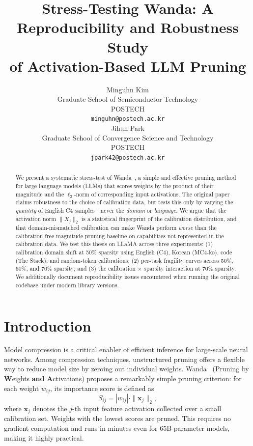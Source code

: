 \documentclass{article}
\title{Stress-Testing Wanda: A Reproducibility and Robustness Study\\
of Activation-Based LLM Pruning}
\author{%
  Minguhn Kim \\
  Graduate School of Semiconductor Technology \\
  POSTECH \\
  \texttt{minguhn@postech.ac.kr} \\
  \And
  Jihun Park \\
  Graduate School of Convergence Science and Technology \\
  POSTECH \\
  \texttt{jpark42@postech.ac.kr}
}
\begin{document}
\maketitle

\begin{abstract}
We present a systematic stress-test of Wanda~\cite{wanda}, a simple and
effective pruning method for large language models (LLMs) that scores weights
by the product of their magnitude and the $\ell_2$-norm of corresponding
input activations. The original paper claims robustness to the choice of
calibration data, but tests this only by varying the \emph{quantity} of
English C4 samples---never the \emph{domain} or \emph{language}. We argue
that the activation norm $\|X_j\|_2$ is a statistical fingerprint of the
calibration distribution, and that domain-mismatched calibration can make
Wanda perform \emph{worse} than the calibration-free magnitude pruning
baseline on capabilities not represented in the calibration data.
We test this thesis on LLaMA across three experiments:
(1) calibration domain shift at 50\% sparsity using English (C4),
Korean (MC4-ko), code (The Stack), and random-token calibrations;
(2) per-task fragility curves across 50\%, 60\%, and 70\% sparsity;
and (3) the calibration $\times$ sparsity interaction at 70\% sparsity.
We additionally document reproducibility issues encountered when running
the original codebase under modern library versions.
\end{abstract}

\section{Introduction}

Model compression is a critical enabler of efficient inference for large-scale
neural networks. Among compression techniques, unstructured pruning offers a
flexible way to reduce model size by zeroing out individual weights.
Wanda~\cite{wanda} (Pruning by \textbf{W}eights \textbf{and} \textbf{A}ctivations)
proposes a remarkably simple pruning criterion: for each weight $w_{ij}$,
its importance score is defined as
\begin{equation}
  S_{ij} = |w_{ij}| \cdot \|\mathbf{x}_j\|_2,
\end{equation}
where $\mathbf{x}_j$ denotes the $j$-th input feature activation collected
over a small calibration set. Weights with the lowest scores are pruned.
This requires no gradient computation and runs in minutes even for
65B-parameter models, making it highly practical.
\end{document}
